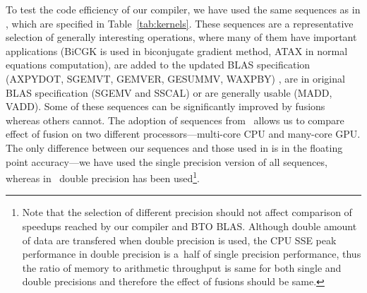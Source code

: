 \documentclass[final]{siamltex}
\begin{document}
{To test the code efficiency of our compiler, we have used the same sequences as in \cite{belter2009automating}, which are specified in Table~\ref{tab:kernels}. These sequences are a representative selection of generally interesting operations, where many of them have important applications (BiCGK is used in biconjugate gradient method, ATAX in normal equations computation), are added to the updated BLAS specification (AXPYDOT, SGEMVT, GEMVER, GESUMMV, WAXPBY) \cite{blackford2002updated}, are in original BLAS specification (SGEMV and SSCAL) or are generally usable (MADD, VADD). Some of these sequences can be significantly improved by fusions whereas others cannot. The adoption of sequences from~\cite{belter2009automating} allows us to compare effect of fusion on two different processors---multi-core CPU and many-core GPU. The only difference between our sequences and those used in \cite{belter2009automating} is in the floating point accuracy---we have used the single precision version of all sequences, whereas in~\cite{belter2009automating} double precision has been used\footnote{Note that the selection of different precision should not affect comparison of speedups reached by our compiler and BTO BLAS. Although double amount of data are transfered when double precision is used, the CPU SSE peak performance in double precision is a~half of single precision performance, thus the ratio of memory to arithmetic throughput is same for both single and double precisions and therefore the effect of fusions should be same.}. 

}
\end{document}
